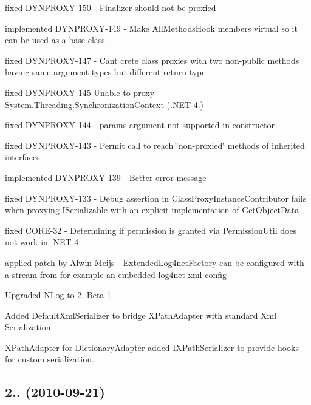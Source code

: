 \begin{DoxyItemize}
\item fixed D\+Y\+N\+P\+R\+O\+X\+Y-\/150 -\/ Finalizer should not be proxied
\item implemented D\+Y\+N\+P\+R\+O\+X\+Y-\/149 -\/ Make All\+Methods\+Hook members virtual so it can be used as a base class
\item fixed D\+Y\+N\+P\+R\+O\+X\+Y-\/147 -\/ Can\textquotesingle{}t crete class proxies with two non-\/public methods having same argument types but different return type
\item fixed D\+Y\+N\+P\+R\+O\+X\+Y-\/145 Unable to proxy System.\+Threading.\+Synchronization\+Context (.N\+ET 4.)
\item fixed D\+Y\+N\+P\+R\+O\+X\+Y-\/144 -\/ params argument not supported in constructor
\item fixed D\+Y\+N\+P\+R\+O\+X\+Y-\/143 -\/ Permit call to reach \char`\"{}non-\/proxied\char`\"{} methods of inherited interfaces
\item implemented D\+Y\+N\+P\+R\+O\+X\+Y-\/139 -\/ Better error message
\item fixed D\+Y\+N\+P\+R\+O\+X\+Y-\/133 -\/ Debug assertion in Class\+Proxy\+Instance\+Contributor fails when proxying I\+Serializable with an explicit implementation of Get\+Object\+Data
\item fixed C\+O\+R\+E-\/32 -\/ Determining if permission is granted via Permission\+Util does not work in .N\+ET 4
\item applied patch by Alwin Meijs -\/ Extended\+Log4net\+Factory can be configured with a stream from for example an embedded log4net xml config
\item Upgraded N\+Log to 2. Beta 1
\item Added Default\+Xml\+Serializer to bridge X\+Path\+Adapter with standard Xml Serialization.
\item X\+Path\+Adapter for Dictionary\+Adapter added I\+X\+Path\+Serializer to provide hooks for custom serialization.
\end{DoxyItemize}

\subsection*{2.. (2010-\/09-\/21)}


